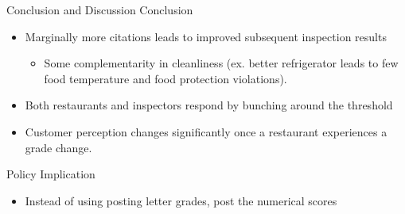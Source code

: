 \documentclass[handout]{beamer}
\begin{document}
\begin{frame}{Conclusion and Discussion}
Conclusion
\begin{itemize}
\item Marginally more citations leads to improved subsequent inspection results
\begin{itemize}
\item Some complementarity in cleanliness (ex. better refrigerator leads to few food temperature and food protection violations). 
\end{itemize}
\item Both restaurants and inspectors respond by bunching around the threshold
\item Customer perception changes significantly once a restaurant experiences a grade change.
\end{itemize}
Policy Implication
\begin{itemize}
\item Instead of using posting letter grades, post the numerical scores
\end{itemize}
\end{frame}
\end{document}
